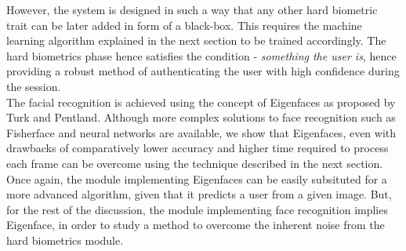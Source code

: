 \documentclass[%
        final,
        notitlepage,
        narroweqnarray,
        inline,
        ]{ieee}
\begin{document}
However, the system is designed in such a way that any other hard biometric trait can be later added in form of a black-box. This requires the machine learning algorithm explained in the next section to be trained accordingly.
The hard biometrics phase hence satisfies the condition - \emph{something the user is}, hence providing a robust method of authenticating the user with high confidence during the session.\\
The facial recognition is achieved using the concept of Eigenfaces\cite{Turk91} as proposed by Turk and Pentland.
Although more complex solutions to face recognition such as Fisherface and neural networks are available, we show that Eigenfaces, even with drawbacks of comparatively lower accuracy and higher time required to process each frame can be overcome using the technique described in the next section.
Once again, the module implementing Eigenfaces can be easily subsituted for a more advanced algorithm, given that it predicts a user from a given image.
But, for the rest of the discussion, the module implementing face recognition implies Eigenface, in order to study a method to overcome the inherent noise from the hard biometrics module.
\end{document}
